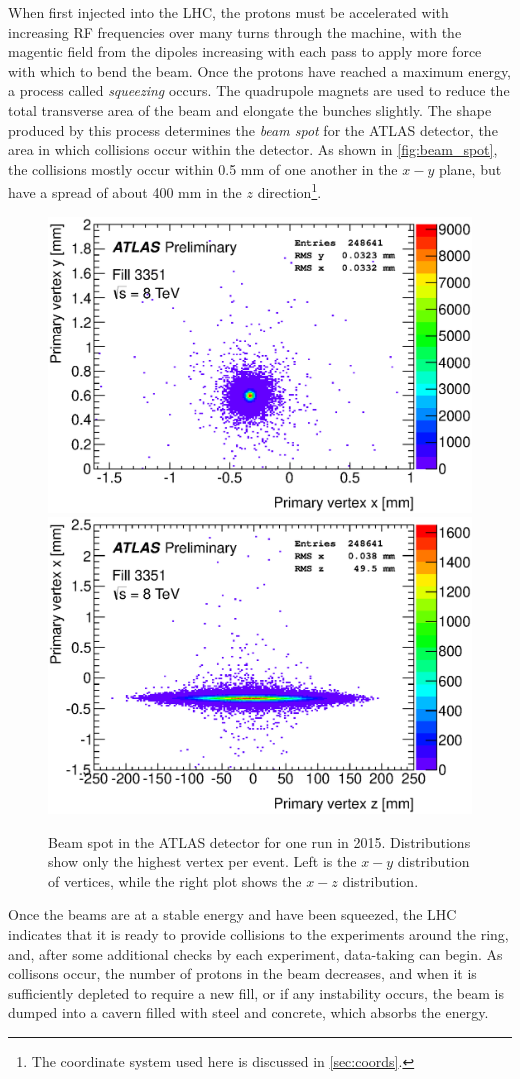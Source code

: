 When first injected into the \ac{LHC}, the protons must be accelerated with increasing \ac{RF} frequencies over many turns through the machine, with the magentic field from the dipoles increasing with each pass to apply more force with which to bend the beam. Once the protons have reached a maximum energy, a process called \textit{squeezing} occurs. The quadrupole magnets are used to reduce the total transverse area of the beam and elongate the bunches slightly. The shape produced by this process determines the \textit{beam spot} for the \ac{ATLAS} detector, the area in which collisions occur within the detector. As shown in \autoref{fig:beam_spot}, the collisions mostly occur within 0.5 mm of one another in the $x-y$ plane, but have a spread of about 400 mm in the $z$ direction\footnote{The coordinate system used here is discussed in \autoref{sec:coords}.}.

\begin{centering}
\begin{figure}[!hbt]
\myfloatalign
\includegraphics[width=.45\linewidth]{figures/lhc/beamspot-run215456-vtx-yx.eps}
\includegraphics[width=.45\linewidth]{figures/lhc/beamspot-run215456-vtx-xz.eps}
\caption{Beam spot in the \ac{ATLAS} detector for one run in 2015. Distributions show only the highest \pt vertex per event. Left is the $x-y$ distribution of vertices, while the right plot shows the $x-z$ distribution.}
\label{fig:beam_spot}
\end{figure}
\end{centering}

Once the beams are at a stable energy and have been squeezed, the \ac{LHC} indicates that it is ready to provide collisions to the experiments around the ring, and, after some additional checks by each experiment, data-taking can begin. As collisons occur, the number of protons in the beam decreases, and when it is sufficiently depleted to require a new fill, or if any instability occurs, the beam is dumped into a cavern filled with steel and concrete, which absorbs the energy. 

